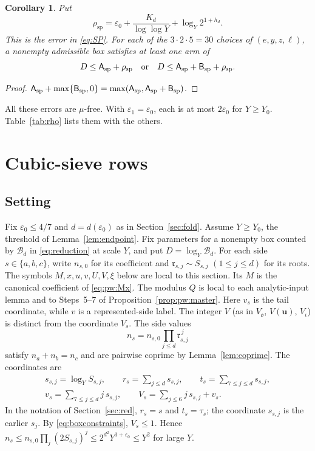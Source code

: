 \documentclass{amsart}
\newtheorem{corollary}[lemma]{Corollary}
\theoremstyle{definition}
\theoremstyle{plain}
\numberwithin{equation}{section}
\numberwithin{table}{section}
\newcommand{\pos}[1]{\max\{#1,0\}}
\begin{document}
\begin{corollary}\label{cor:spacing}
Put
\[
 \rho_{\mathrm{sp}}=\varepsilon_0+\frac{K_d}{\log\log Y}+\log_Y2^{1+h_d}.
\]
This is the error in \eqref{eq:SP}. For each of the
$3\cdot2\cdot5=30$ choices of $(e,y,z,\ell)$, a
nonempty admissible box satisfies at least one arm of
\begin{equation}\label{eq:SPor}
 D\le\mathsf A_{\rm sp}+\rho_{\mathrm{sp}}\quad\text{or}\quad
 D\le\mathsf A_{\rm sp}+\mathsf B_{\rm sp}+\rho_{\mathrm{sp}} .
\end{equation}
\end{corollary}

\begin{proof}
$\mathsf A_{\rm sp}+\pos{\mathsf B_{\rm sp}}
=\max(\mathsf A_{\rm sp},\mathsf A_{\rm sp}+\mathsf B_{\rm sp})$.
\end{proof}

All these errors are $\mu$-free. With $\varepsilon_1=\varepsilon_0$, each is at
most $2\varepsilon_0$ for $Y\ge Y_0$. Table~\ref{tab:rho}
lists them with the others.

\section{Cubic-sieve rows}\label{sec:pow3}

\subsection{Setting}\label{sec:pow3:setting}

Fix $\varepsilon_0\le4/7$ and $d=d(\varepsilon_0)$ as in
Section~\ref{sec:fold}. Assume
$Y\ge Y_0$, the threshold of Lemma~\ref{lem:endpoint}. Fix parameters for a nonempty
box counted by $\mathcal B_d$ in \eqref{eq:reduction} at scale $Y$, and put
$D=\log_Y\mathcal B_d$. For each side $s\in\{a,b,c\}$, write $n_{s,0}$ for its
 coefficient and $\mathfrak r_{s,j}\sim S_{s,j}$ $(1\le j\le d)$ for its roots.
The symbols $M,x,u,v,U,V,\xi$ below are local to this section. Its $M$
is the canonical coefficient of \eqref{eq:pw:Mx}. The
modulus $Q$ is local to each analytic-input lemma and to Steps~5--7 of
Proposition~\ref{prop:pw:master}. Here
$v_s$ is the tail coordinate, while $v$ is a represented-side label. The
integer $V$ (as in $V_{\mathfrak o}$, $V(\mathbf u)$, $V_\iota$) is distinct
from the coordinate $V_s$.
The side values
\[
 n_s=n_{s,0}\prod_{j\le d}\mathfrak r_{s,j}^{\,j}
\]
 satisfy $n_a+n_b=n_c$ and are pairwise coprime by Lemma~\ref{lem:coprime}. The
coordinates are
\begin{equation}\label{eq:pw:coord}
 \begin{gathered}
 s_{s,j}=\log_YS_{s,j},\qquad
 r_s=\sum_{j\le d}s_{s,j},\qquad
 t_s=\sum_{7\le j\le d}s_{s,j},\\
 v_s=\sum_{7\le j\le d}j\,s_{s,j},\qquad
 V_s=\sum_{j\le6}j\,s_{s,j}+v_s .
 \end{gathered}
\end{equation}
In the notation of Section~\ref{sec:red}, $r_s=s$ and $t_s=\tau_s$; the
coordinate $s_{s,j}$ is the earlier $s_j$. By
\eqref{eq:boxconstraints}, $V_s\le1$. Hence $n_s\le n_{s,0}\prod_j(2S_{s,j})^j\le
2^{d^2}Y^{1+\varepsilon_0}\le Y^2$ for large $Y$.
\end{document}
